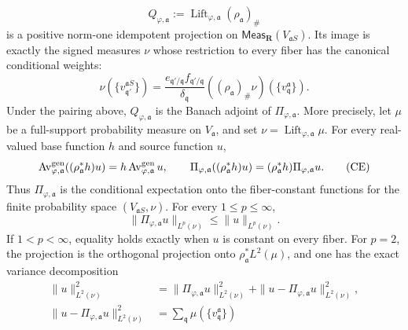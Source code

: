 \begin{theorem}
\begin{enumerate}
      \[
       Q_{\varphi,\mathfrak a}
         :=\operatorname{Lift}_{\varphi,\mathfrak a}
              (\rho_{\mathfrak a})_\#
       \tag{\(\circledcirc\circledast\)}
       \label{eq:p126-curve-generic-measure-projection}
      \]
      is a positive norm-one idempotent projection on
      \(\mathsf{Meas}_{\mathbf R}(V_{\mathfrak aS})\).  Its image is exactly
      the signed
      measures \(\nu\) whose restriction to every fiber has the canonical
      conditional weights:
      \[
       \nu(\{v_{\mathfrak q'}^{\mathfrak aS}\})
        =\frac{e_{\mathfrak q'/\mathfrak q}
                    f_{\mathfrak q'/\mathfrak q}}
                {\delta_{\mathfrak q}}
          ((\rho_{\mathfrak a})_\#\nu)
             (\{v_{\mathfrak q}^{\mathfrak a}\}).
       \tag{\(\bullet\circledast\)}
       \label{eq:p126-curve-generic-measure-projection-image}
      \]
      Under the pairing above, \(Q_{\varphi,\mathfrak a}\) is the Banach
      adjoint of \(\Pi_{\varphi,\mathfrak a}\).  More precisely, let
      \(\mu\) be a full-support probability measure on
      \(V_{\mathfrak a}\), and set
      \(\nu=\operatorname{Lift}_{\varphi,\mathfrak a}\mu\).  For every
      real-valued base function \(h\) and source function \(u\),
      \[
       \operatorname{Av}^{\mathrm{gen}}_{\varphi,\mathfrak a}
          ((\rho_{\mathfrak a}^*h)u)
        =h\operatorname{Av}^{\mathrm{gen}}_{\varphi,\mathfrak a}u,
       \qquad
       \Pi_{\varphi,\mathfrak a}((\rho_{\mathfrak a}^*h)u)
        =(\rho_{\mathfrak a}^*h)\Pi_{\varphi,\mathfrak a}u.
       \tag{\(\mathrm{CE}\)}
       \label{eq:p126-curve-generic-module-identity}
      \]
      Thus \(\Pi_{\varphi,\mathfrak a}\) is the conditional expectation
      onto the fiber-constant functions for the finite probability space
      \((V_{\mathfrak aS},\nu)\).  For every \(1\leq p\leq\infty\),
      \[
       \|\Pi_{\varphi,\mathfrak a}u\|_{L^p(\nu)}
          \leq \|u\|_{L^p(\nu)}.
       \tag{\(L^p\)}
       \label{eq:p126-curve-generic-lp-contraction}
      \]
      If \(1<p<\infty\), equality holds exactly when \(u\) is constant
      on every fiber.  For \(p=2\), the projection is the orthogonal
      projection onto \(\rho_{\mathfrak a}^*L^2(\mu)\), and one has the
      exact variance decomposition
      \[
       \begin{split}
       \|u\|_{L^2(\nu)}^2
        &=\|\Pi_{\varphi,\mathfrak a}u\|_{L^2(\nu)}^2
          +\|u-\Pi_{\varphi,\mathfrak a}u\|_{L^2(\nu)}^2,\\
       \|u-\Pi_{\varphi,\mathfrak a}u\|_{L^2(\nu)}^2
        &=\sum_{\mathfrak q}\mu(\{v_{\mathfrak q}^{\mathfrak a}\})

\end{split}\]
\end{enumerate}
\end{theorem}
